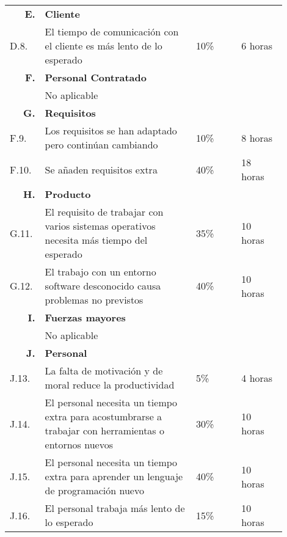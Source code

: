 \begin{table}[H]
\begin{tabular}{p{0.1\linewidth}p{0.5\linewidth}p{0.15\linewidth}p{0.15\linewidth}}
		\multicolumn{1}{r}{\cellcolor{black!30}\textbf{E. }} &
		\multicolumn{3}{l}{\cellcolor{black!30}\textbf{Cliente}}\\
		D.8. &El tiempo de comunicación con el cliente es más lento de lo esperado			&	10\%	&	6 horas\\
		
		\multicolumn{1}{r}{\cellcolor{black!30}\textbf{F. }} &
		\multicolumn{3}{l}{\cellcolor{black!30}\textbf{Personal Contratado}}\\
		&No aplicable&&\\
		
		\multicolumn{1}{r}{\cellcolor{black!30}\textbf{G. }} &
		\multicolumn{3}{l}{\cellcolor{black!30}\textbf{Requisitos}}\\
		F.9. &Los requisitos se han adaptado pero continúan cambiando							&	10\%	& 8 horas\\
		F.10. &Se añaden requisitos extra														&	40\%	& 18 horas\\
		
		\multicolumn{1}{r}{\cellcolor{black!30}\textbf{H. }} &
		\multicolumn{3}{l}{\cellcolor{black!30}\textbf{Producto}}\\ 
		G.11. &El requisito de trabajar con varios sistemas operativos necesita más tiempo del esperado	&	35\%	& 10 horas\\
		G.12. &El trabajo con un entorno software desconocido causa problemas no previstos	&	40\%	& 10 horas\\
		
		\multicolumn{1}{r}{\cellcolor{black!30}\textbf{I. }} &
		\multicolumn{3}{l}{\cellcolor{black!30}\textbf{Fuerzas mayores}}\\
		&No aplicable&&\\	
		
		\multicolumn{1}{r}{\cellcolor{black!30}\textbf{J. }} &
		\multicolumn{3}{l}{\cellcolor{black!30}\textbf{Personal}}\\
		J.13. &La falta de motivación y de moral reduce la productividad						&	5\%		& 4 horas\\
		J.14. &El personal necesita un tiempo extra para acostumbrarse a trabajar con herramientas o entornos nuevos	&	30\%	&	10 horas\\
		J.15. &El personal necesita un tiempo extra para aprender un lenguaje de programación nuevo	&	40\%	&	10 horas\\
		J.16. &El personal trabaja más lento de lo esperado									&	15\%	&	10 horas\\
		

\end{tabular}
\end{table}
